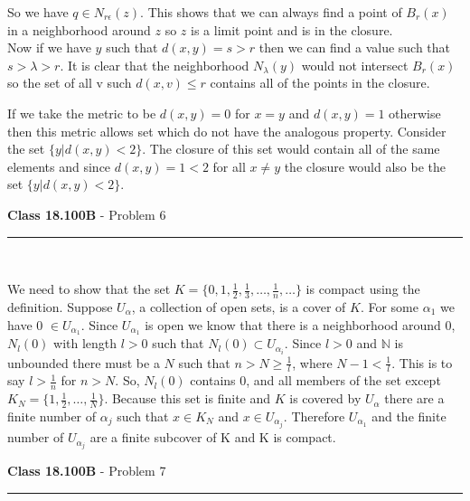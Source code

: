 \documentclass[11pt,reqno]{article}
\begin{document}
So we have $q \in N_{r \epsilon}(z)$. This shows that we can always find a point of $B_r(x)$ in a neighborhood around $z$ so $z$ is a limit point and is in the closure.\\
\indent Now if we have $y$ such that $d(x,y) = s > r$ then we can find a value such that $s > \lambda > r$. It is clear that the neighborhood $N_\lambda(y)$ would not intersect $B_r(x)$ so the set of all v such $d(x,v) \le r$ contains all of the points in the closure.

If we take the metric to be $d(x,y) = 0$ for $x = y$ and $d(x,y) = 1$ otherwise then this metric allows set which do not have the analogous property. Consider the set $\{ y | d(x,y) < 2 \}$. The closure of this set would contain all of the same elements and since $d(x,y) = 1 < 2$ for all $x \neq y$ the closure would also be the set $\{ y | d(x,y) < 2 \}$.

\vspace{15pt}
\begin{flushleft} 
\textbf{Class 18.100B} - Problem 6\\
\rule{500pt}{1pt}\\
\end{flushleft} 

We need to show that the set $K = \{ 0,1,\frac{1}{2}, \frac{1}{3}, \ldots, \frac{1}{n}, \ldots \}$ is compact using the definition. Suppose $U_\alpha$, a collection of open sets, is a cover of $K$. For some $\alpha_1$ we have 0 $\in U_{\alpha_1}$. Since $U_{\alpha_1}$ is open we know that there is  a neighborhood around 0, $N_l(0)$ with length $l > 0$ such that $N_l(0) \subset U_{\alpha_i}$. Since $l > 0$ and $\mathbb{N}$ is unbounded there must be a $N$ such that $n > N \ge \frac{1}{l}$, where $N - 1 < \frac{1}{l}$. This is to say $l > \frac{1}{n}$ for $n > N$. So, $N_l(0)$ contains 0, and all members of the set except $K _N = \{1, \frac{1}{2}, \ldots, \frac{1}{N}\}$. Because this set is finite and $K$ is covered by $U_\alpha$ there are a finite number of $\alpha_j$ such that $x \in K_N$ and $x \in U_{\alpha_j}$.  Therefore $U_{\alpha_1}$ and the finite number of $U_{\alpha_j}$ are a finite subcover of K and K is compact.

\vspace{15pt}
\begin{flushleft} 
\textbf{Class 18.100B} - Problem 7\\
\rule{500pt}{1pt}\\
\end{flushleft} 
\end{document}
